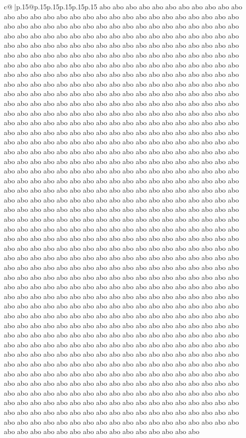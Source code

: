 \documentclass{article}
\begin{document}
{\begin{supertabular}{c@{$\;$}|p{.15\linewidth}@{}p{.15\linewidth}p{.15\linewidth}p{.15\linewidth}p{.15\linewidth}p{.15\linewidth}}
{{{abo abo abo abo abo abo abo abo abo abo abo abo abo abo abo abo abo abo abo abo abo abo abo abo abo abo abo abo abo abo abo abo abo abo abo abo abo abo abo abo abo abo abo abo abo abo abo abo abo abo abo abo abo abo abo abo abo abo abo abo abo abo abo abo abo abo abo abo abo abo abo abo abo abo abo abo abo abo abo abo abo abo abo abo abo abo abo abo abo abo abo abo abo abo abo abo abo abo abo abo abo abo abo abo abo abo abo abo abo abo abo abo abo abo abo abo abo abo abo abo abo abo abo abo abo abo abo abo abo abo abo abo abo abo abo abo abo abo abo abo abo abo abo abo abo abo abo abo abo abo abo abo abo abo abo abo abo abo abo abo abo abo abo abo abo abo abo abo abo abo abo abo abo abo abo abo abo abo abo abo abo abo abo abo abo abo abo abo abo abo abo abo abo abo abo abo abo abo abo abo abo abo abo abo abo abo abo abo abo abo abo abo abo abo abo abo abo abo abo abo abo abo abo abo abo abo abo abo abo abo abo abo abo abo abo abo abo abo abo abo abo abo abo abo abo abo abo abo abo abo abo abo abo abo abo abo abo abo abo abo abo abo abo abo abo abo abo abo abo abo abo abo abo abo abo abo abo abo abo abo abo abo abo abo abo abo abo abo abo abo abo abo abo abo abo abo abo abo abo abo abo abo abo abo abo abo abo abo abo abo abo abo abo abo abo abo abo abo abo abo abo abo abo abo abo abo abo abo abo abo abo abo abo abo abo abo abo abo abo abo abo abo abo abo abo abo abo abo abo abo abo abo abo abo abo abo abo abo abo abo abo abo abo abo abo abo abo abo abo abo abo abo abo abo abo abo abo abo abo abo abo abo abo abo abo abo abo abo abo abo abo abo abo abo abo abo abo abo abo abo abo abo abo abo abo abo abo abo abo abo abo abo abo abo abo abo abo abo abo abo abo abo abo abo abo abo abo abo abo abo abo abo abo abo abo abo abo abo abo abo abo abo abo abo abo abo abo abo abo abo abo abo abo abo abo abo abo abo abo abo abo abo abo abo abo abo abo abo abo abo abo abo abo abo abo abo abo abo abo abo abo abo abo abo abo abo abo abo abo abo abo abo abo abo abo abo abo abo abo abo abo abo abo abo abo abo abo abo abo abo abo abo abo abo abo abo abo abo abo abo abo abo abo abo abo abo abo abo abo abo abo abo abo abo abo abo abo abo abo abo abo abo abo abo abo abo abo abo abo abo abo abo abo abo abo abo abo abo abo abo abo abo abo abo abo abo abo abo abo abo abo abo abo abo abo abo abo abo abo abo abo abo abo abo abo abo abo abo abo abo abo abo abo abo abo abo abo abo abo abo abo abo abo abo abo abo abo abo abo abo abo abo abo abo abo abo abo abo abo abo abo abo abo abo abo abo abo abo abo abo abo abo abo abo abo abo abo abo abo abo abo abo abo abo abo abo abo abo abo abo abo abo abo abo abo abo abo abo abo abo abo abo abo abo abo abo abo abo abo abo abo abo abo abo abo abo abo abo abo abo abo abo abo abo abo abo abo abo abo abo abo abo abo abo abo abo abo abo abo abo abo abo abo abo abo abo abo abo abo abo abo abo abo abo abo abo abo abo abo abo abo abo abo abo abo abo abo abo abo abo abo abo abo abo abo abo abo abo abo abo abo abo abo abo abo abo abo abo abo abo abo abo abo abo abo abo abo abo abo abo abo abo abo abo abo abo abo abo abo abo abo abo abo abo abo abo abo abo abo abo abo abo abo abo abo abo abo abo abo abo abo abo abo abo abo abo abo abo abo abo }}}
\end{supertabular}}
\end{document}
